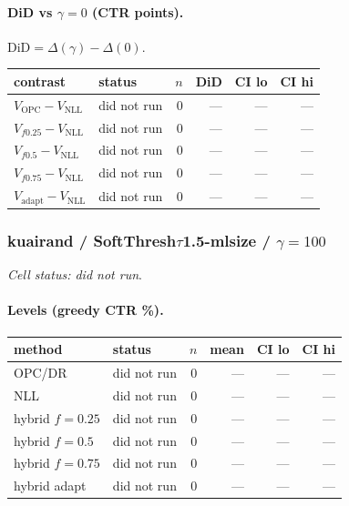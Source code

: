 \documentclass[10pt,a4paper]{article}
\begin{document}
\paragraph{DiD vs $\gamma=0$ (CTR points).} $\mathrm{DiD}=\Delta(\gamma)-\Delta(0)$.
{\centering\small\begin{tabular}{llrrrr}
\toprule contrast & status & $n$ & DiD & CI lo & CI hi \\
\midrule
$V_{\mathrm{OPC}}-V_{\mathrm{NLL}}$ & did not run & 0 & --- & --- & --- \\
$V_{f0.25}-V_{\mathrm{NLL}}$ & did not run & 0 & --- & --- & --- \\
$V_{f0.5}-V_{\mathrm{NLL}}$ & did not run & 0 & --- & --- & --- \\
$V_{f0.75}-V_{\mathrm{NLL}}$ & did not run & 0 & --- & --- & --- \\
$V_{\mathrm{adapt}}-V_{\mathrm{NLL}}$ & did not run & 0 & --- & --- & --- \\
\bottomrule\end{tabular}\par}
\bigskip
\subsubsection{kuairand / SoftThresh$\tau$1.5-mlsize / $\gamma=100$}
\emph{Cell status: did not run}.
\paragraph{Levels (greedy CTR \%).}
{\centering\small\begin{tabular}{llrrrr}
\toprule method & status & $n$ & mean & CI lo & CI hi \\
\midrule
OPC/DR & did not run & 0 & --- & --- & --- \\
NLL & did not run & 0 & --- & --- & --- \\
hybrid $f{=}0.25$ & did not run & 0 & --- & --- & --- \\
hybrid $f{=}0.5$ & did not run & 0 & --- & --- & --- \\
hybrid $f{=}0.75$ & did not run & 0 & --- & --- & --- \\
hybrid adapt & did not run & 0 & --- & --- & --- \\
\bottomrule\end{tabular}\par}
\end{document}
